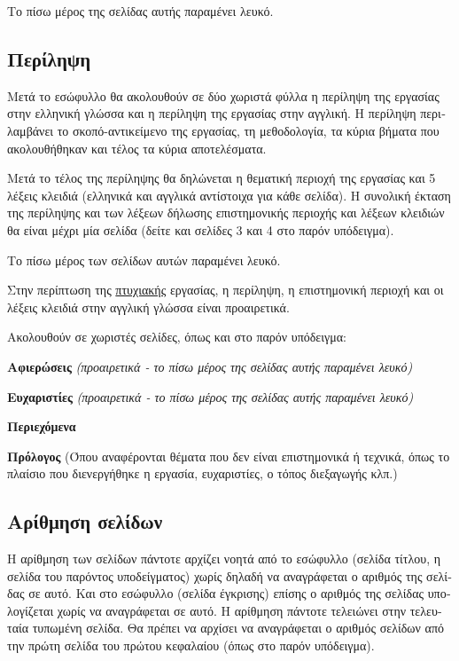 \documentclass[inscr,ack,preface]{dithesis}
\begin{document}
\begin{greek}
    Το πίσω μέρος της σελίδας αυτής παραμένει λευκό.

    \subsection{Περίληψη}
    Μετά το  εσώφυλλο θα ακολουθούν σε δύο χωριστά φύλλα η περίληψη της εργασίας στην ελληνική γλώσσα και η περίληψη της εργασίας στην αγγλική. Η περίληψη περιλαμβάνει το σκοπό-αντικείμενο της εργασίας, τη μεθοδολογία, τα κύρια βήματα που ακολουθήθηκαν και τέλος τα κύρια αποτελέσματα.

    Μετά το τέλος της περίληψης θα δηλώνεται η θεματική περιοχή της εργασίας και 5 λέξεις κλειδιά (ελληνικά και αγγλικά αντίστοιχα για κάθε σελίδα). Η συνολική έκταση της περίληψης και των λέξεων δήλωσης επιστημονικής περιοχής και λέξεων κλειδιών θα είναι μέχρι μία σελίδα (δείτε και σελίδες 3 και 4 στο παρόν υπόδειγμα).

    Το πίσω μέρος των σελίδων αυτών παραμένει λευκό.

    Στην περίπτωση της \underline{πτυχιακής} εργασίας, η περίληψη, η επιστημονική περιοχή και οι λέξεις κλειδιά στην αγγλική γλώσσα είναι προαιρετικά.

    Ακολουθούν σε χωριστές σελίδες, όπως και στο παρόν υπόδειγμα:

    \textbf{Αφιερώσεις} \textit{(προαιρετικά - το πίσω μέρος της σελίδας αυτής παραμένει λευκό)}

    \textbf{Ευχαριστίες} \textit{(προαιρετικά - το πίσω μέρος της σελίδας αυτής παραμένει  λευκό)}

    \textbf{Περιεχόμενα}

    \textbf{Πρόλογος} (Όπου αναφέρονται θέματα που δεν είναι επιστημονικά ή τεχνικά, όπως το πλαίσιο που διενεργήθηκε η εργασία, ευχαριστίες, ο τόπος διεξαγωγής κλπ.)

    \subsection{Αρίθμηση σελίδων}
    Η αρίθμηση των σελίδων πάντοτε αρχίζει νοητά από το  εσώφυλλο (σελίδα τίτλου, η  σελίδα του παρόντος υποδείγματος) χωρίς δηλαδή να αναγράφεται ο αριθμός της σελίδας σε αυτό. Και στο  εσώφυλλο (σελίδα έγκρισης) επίσης ο αριθμός της σελίδας υπολογίζεται χωρίς  να αναγράφεται σε αυτό. Η αρίθμηση πάντοτε τελειώνει στην τελευταία τυπωμένη σελίδα. Θα πρέπει να αρχίσει να αναγράφεται ο αριθμός σελίδων από την πρώτη σελίδα του πρώτου κεφαλαίου (όπως στο παρόν υπόδειγμα).


\end{greek}
\end{document}
